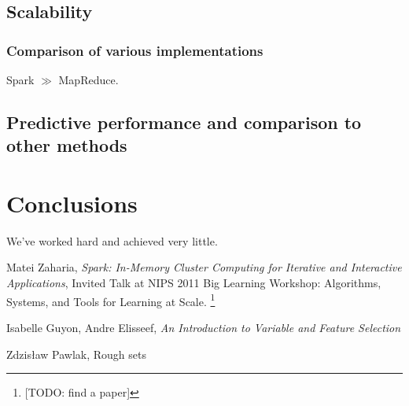 \documentclass[12pt]{pracamgr}
\begin{document}
\section{Scalability}
\subsection{Comparison of various implementations}

Spark $\gg$ MapReduce.

\section{Predictive performance and comparison to other methods}

\chapter{Conclusions}

We've worked hard and achieved very little.

\begin{thebibliography}{9}

 Matei Zaharia, \emph{Spark: In-Memory Cluster Computing for Iterative and
                  Interactive Applications}, Invited Talk at NIPS 2011 Big Learning
                  Workshop: Algorithms, Systems, and Tools for Learning at Scale.
                  \footnote{[TODO: find a paper]}
                  
 Isabelle Guyon, Andre Elisseef, \emph{An Introduction to Variable and
                Feature Selection}
                
 Zdzis\l{}aw Pawlak, Rough sets

\end{thebibliography}
\end{document}
